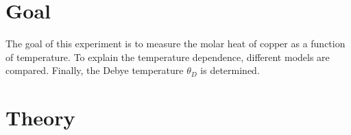 


\section{Goal}
\label{sec:goal}
The goal of this experiment is to measure the molar heat of copper as a function of temperature.
To explain the temperature dependence, different models are compared.
Finally, the Debye temperature $\theta_D$ is determined.

\section{Theory}
\label{sec:theory}

